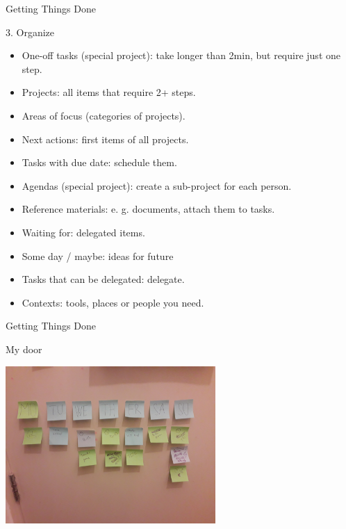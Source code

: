 \begin{frame}{Getting Things Done}
  \begin{block}{3. Organize}
    \begin{itemize}
      \item One-off tasks (special project): take longer than 2min, but require just one step.
      \item Projects: all items that require 2+ steps.
      \item Areas of focus (categories of projects).
      \item Next actions: first items of all projects.
      \item Tasks with due date: schedule them.
      \item Agendas (special project): create a sub-project for each person.
      \item Reference materials: e. g. documents, attach them to tasks.
      \item Waiting for: delegated items.
      \item Some day / maybe: ideas for future
      \item Tasks that can be delegated: delegate.
      \item Contexts: tools, places or people you need. %
    \end{itemize}
  \end{block}
\end{frame}

\begin{frame}{Getting Things Done}
  \begin{block}{My door}
    \begin{center}
      \includegraphics[height=6cm]{img/week-agenda-01.jpg}
    \end{center}
  \end{block}
\end{frame}

